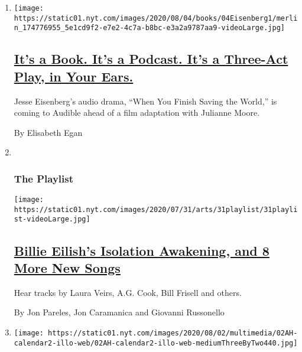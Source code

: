 \begin{enumerate}
\def\labelenumi{\arabic{enumi}.}
\item
  \texttt{[image: https://static01.nyt.com/images/2020/08/04/books/04Eisenberg1/merlin\_174776955\_5e1cd9f2-e7e2-4c7a-b8bc-e3a2a9787aa9-videoLarge.jpg]}

  \hypertarget{its-a-book-its-a-podcast-its-a-three-act-play-in-your-ears}{%
  \subsection{\texorpdfstring{\href{/2020/08/02/books/jesse-eisenberg-when-you-finish-saving-the-world-audio.html}{It's
  a Book. It's a Podcast. It's a Three-Act Play, in Your
  Ears.}}{It's a Book. It's a Podcast. It's a Three-Act Play, in Your Ears.}}\label{its-a-book-its-a-podcast-its-a-three-act-play-in-your-ears}}

  Jesse Eisenberg's audio drama, ``When You Finish Saving the World,''
  is coming to Audible ahead of a film adaptation with Julianne Moore.

  By Elisabeth Egan
\item ~
  \hypertarget{the-playlist}{%
  \subsubsection{The Playlist}\label{the-playlist}}

  \texttt{[image: https://static01.nyt.com/images/2020/07/31/arts/31playlist/31playlist-videoLarge.jpg]}

  \hypertarget{billie-eilishs-isolation-awakening-and-8-more-new-songs}{%
  \subsection{\texorpdfstring{\href{/2020/07/31/arts/music/playlist-billie-eilish-snakehips-a-boogie.html}{Billie
  Eilish's Isolation Awakening, and 8 More New
  Songs}}{Billie Eilish's Isolation Awakening, and 8 More New Songs}}\label{billie-eilishs-isolation-awakening-and-8-more-new-songs}}

  Hear tracks by Laura Veirs, A.G. Cook, Bill Frisell and others.

  By Jon Pareles, Jon Caramanica and Giovanni Russonello
\item
  \texttt{[image: https://static01.nyt.com/images/2020/08/02/multimedia/02AH-calendar2-illo-web/02AH-calendar2-illo-web-mediumThreeByTwo440.jpg]}

  \hypertarget{spend-time-with-shakespeares-family-and-take-a-master-class-in-ballet}{%
}
\end{enumerate}

